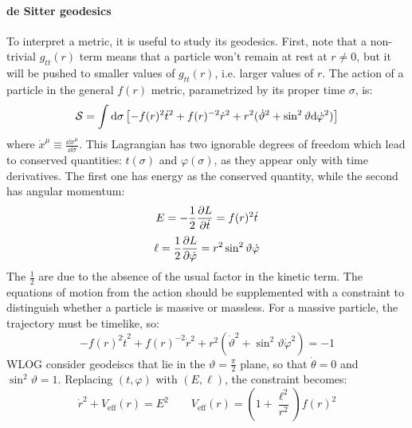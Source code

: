 \paragraph{de Sitter geodesics}

To interpret a metric, it is useful to study its geodesics. First, note that a non-trivial $ g_{tt}(r) $ term means that a particle won't remain at rest at $ r \neq 0 $, but it will be pushed to smaller values of $ g_{tt}(r) $, i.e. larger values of $ r $. The action of a particle in the general $ f(r) $ metric, parametrized by its proper time $ \sigma $, is:
\begin{equation}
  \mathcal{S} = \int \mathrm{d} \sigma \left[ - f(r)^2 \dot{t}^2 + f(r)^{-2} \dot{r}^2 + r^2 (\dot{\vartheta}^2 + \sin^2 \vartheta \mathrm{d} \dot{\varphi}^2) \right]
  \label{eq:dS-action}
\end{equation}
where $ \dot{x}^\mu \equiv \frac{\dd x^\mu}{\dd \sigma} $. This Lagrangian has two ignorable degrees of freedom which lead to conserved quantities: $ t(\sigma) $ and $ \varphi(\sigma) $, as they appear only with time derivatives. The first one has energy as the conserved quantity, while the second has angular momentum:
\begin{equation}
  E = - \frac{1}{2} \frac{\partial L}{\partial \dot{t}} = f(r)^2 \dot{t}
  \label{eq:dS-energy}
\end{equation}
\begin{equation}
  \ell = \frac{1}{2} \frac{\partial L}{\partial \dot{\varphi}} = r^2 \sin^2 \vartheta \dot{\varphi}
  \label{eq:dS-ang-mom}
\end{equation}
The $ \frac{1}{2} $ are due to the absence of the usual factor in the kinetic term. The equations of motion from the action  should be supplemented with a constraint to distinguish whether a particle is massive or massless. For a massive particle, the trajectory must be timelike, so:
\begin{equation*}
  - f(r)^2 \dot{t}^2 + f(r)^{-2} \dot{r}^2 + r^2 (\dot{\vartheta}^2 + \sin^2 \vartheta \dot{\varphi}^2) = -1
\end{equation*}
WLOG consider geodeiscs that lie in the $ \vartheta = \frac{\pi}{2} $ plane, so that $ \dot{\theta} = 0 $ and $ \sin^2 \vartheta = 1 $. Replacing $ (t,\varphi) $ with $ (E,\ell) $, the constraint becomes:
\begin{equation}
  \dot{r}^2 + V_{\text{eff}}(r) = E^2
  \qquad
  V_{\text{eff}}(r) = \left( 1 + \frac{\ell^2}{r^2} \right) f(r)^2
\end{equation}

